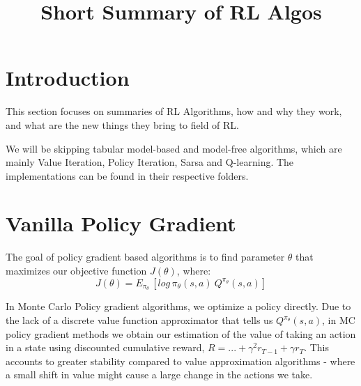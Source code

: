 \documentclass[12pt]{article} %
\title{Short Summary of RL Algos}
\author{}
\date{}
\begin{document}
\maketitle

\tableofcontents

\newpage

\section{Introduction}
This section focuses on summaries of RL Algorithms, how and why they work, and what are the new things they bring to field of RL.

We will be skipping tabular model-based and model-free algorithms, which are mainly Value Iteration, Policy Iteration, Sarsa and Q-learning. The implementations can be found in their respective folders.
\section{Vanilla Policy Gradient}
The goal of policy gradient based algorithms is to find parameter $\theta$ that maximizes our objective function $J(\theta)$, where:
\begin{equation*}
    J(\theta) = E_{\pi_\theta}\,[log\,\pi_\theta(s,a)\: Q^{\pi_\theta}(s,a)]
\end{equation*}

In Monte Carlo Policy gradient algorithms, we optimize a policy directly. Due to the lack of a discrete value function approximator that tells us $Q^{\pi_\theta}(s,a)$, in MC policy gradient methods we obtain our estimation of the value of taking an action in a state using discounted cumulative reward, $R = ...+\gamma^2 r_{T-1} + \gamma r_T$. This accounts to greater stability compared to value approximation algorithms - where a small shift in value might cause a large change in the actions we take.
\end{document}
